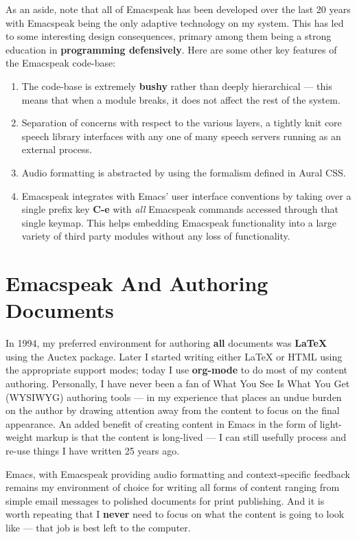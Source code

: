 \documentclass[11pt]{article}
\begin{document}
As an aside, note that all of Emacspeak has been developed over
the last 20 years with Emacspeak being the only adaptive
technology on my system. This has led to  some interesting design
consequences, primary among them being  a strong education in
\textbf{programming defensively}.  Here are some other key features of
the Emacspeak code-base:

\begin{enumerate}
\item The code-base is extremely \textbf{bushy} rather than deeply
hierarchical — this means that when a module breaks, it does
not affect the rest of the system.
\item Separation of concerns with respect to the various layers, a
tightly knit  core speech library  interfaces  with  any one
of many  speech servers  running as an external process.
\item Audio formatting is abstracted by using the formalism
defined in Aural CSS.
\item Emacspeak integrates with Emacs' user interface conventions
by taking over a single prefix key \textbf{C-e} with \emph{all}
Emacspeak commands accessed through that single keymap.
This helps embedding Emacspeak functionality into a large
variety of third party modules without any loss of functionality.
\end{enumerate}


\section{Emacspeak And Authoring Documents}
\label{sec:org694f9ef}

In 1994, my preferred environment for authoring \textbf{all} documents
was \textbf{\LaTeX{}} using the Auctex package. Later I started writing
either \LaTeX{} or HTML using the appropriate support modes; today I
use \textbf{org-mode} to do most of my content authoring. Personally, I
have never been a fan of What You See Is What You Get (WYSIWYG)
authoring tools — in my experience that places an undue burden on
the author by drawing attention away from the content to focus on
the final appearance. An added benefit of creating content in
Emacs in the form of light-weight markup is that the content is
long-lived — I can still usefully process and re-use things I
have written 25 years ago.

Emacs, with Emacspeak providing audio formatting and
context-specific feedback remains my environment of choice for
writing all forms of content ranging from simple email messages
to polished documents for print publishing. And it is worth
repeating that I \textbf{never} need to focus on what the content is
going to look like — that job is best left to the computer.
\end{document}
